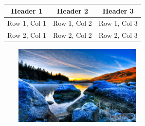 \documentclass{article}
\begin{document}
\begin{table}[ht]
\centering
\begin{tabular}{|c|c|c|}
\hline
Header 1 & Header 2 & Header 3 \\
\hline
Row 1, Col 1 & Row 1, Col 2 & Row 1, Col 3 \\
\hline
Row 2, Col 1 & Row 2, Col 2 & Row 2, Col 3 \\
\hline
\end{tabular}
\end{table}
\includegraphics[width=8cm, height=4cm]{./img}
\end{document}
